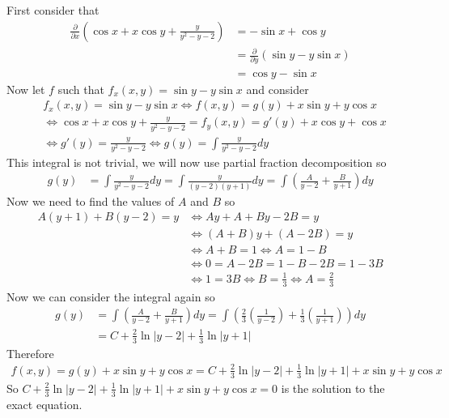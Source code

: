 \documentclass[notes.tex]{subfiles}
\begin{document}
\begin{solution}
    First consider that
    \begin{align*}
        \frac{\partial}{\partial x}\left(\cos x + x\cos y + \frac{y}{y^2 - y - 2}\right)
        &= -\sin x + \cos y \\
        &= \frac{\partial}{\partial y}(\sin y - y\sin x) \\
        &= \cos y - \sin x
    \end{align*}
    Now let $f$ such that $f_x(x, y) = \sin y - y\sin x$ and consider
    \begin{align*}
        &f_x(x, y) = \sin y - y\sin x
        \iff f(x, y) = g(y) + x\sin y + y\cos x \\
        &\iff \cos x + x\cos y + \frac{y}{y^2 - y - 2} = f_y(x, y) = g'(y) + x\cos y + \cos x \\
        &\iff g'(y) = \frac{y}{y^2 - y - 2} \iff g(y) = \int \frac{y}{y^2 - y - 2} dy
    \end{align*}
    This integral is not trivial, we will now use partial fraction decomposition so
    \begin{align*}
        g(y)
        &= \int \frac{y}{y^2 - y - 2} dy
        = \int \frac{y}{(y - 2)(y + 1)}dy
        = \int \left( \frac{A}{y - 2} + \frac{B}{y + 1} \right)dy
    \end{align*}
    Now we need to find the values of $A$ and $B$ so
    \begin{align*}
        A(y + 1) + B(y - 2) = y
        &\iff Ay + A + By - 2B = y \\
        &\iff (A + B)y + (A - 2B) = y \\
        &\iff A + B = 1
        \iff A = 1 - B \\
        &\iff 0 = A - 2B = 1 - B - 2B = 1 - 3B \\
        &\iff 1 = 3B
        \iff B = \frac{1}{3} \iff A = \frac{2}{3}
    \end{align*}
    Now we can consider the integral again so
    \begin{align*}
        g(y)
        &= \int \left( \frac{A}{y - 2} + \frac{B}{y + 1} \right)dy
        = \int \left( \frac{2}{3}\left( \frac{1}{y - 2} \right) + \frac{1}{3}\left(\frac{1}{y + 1}\right) \right) dy \\
        &= C + \frac{2}{3}\ln|y - 2| + \frac{1}{3}\ln|y + 1|
    \end{align*}
    Therefore
    \begin{align*}
        f(x, y) = g(y) + x\sin y + y\cos x = C + \frac{2}{3}\ln|y - 2| + \frac{1}{3}\ln|y + 1| + x\sin y + y\cos x
    \end{align*}
    So $C + \frac{2}{3}\ln|y - 2| + \frac{1}{3}\ln|y + 1| + x\sin y + y\cos x = 0$ is the solution to the exact equation.
\end{solution}
\end{document}
